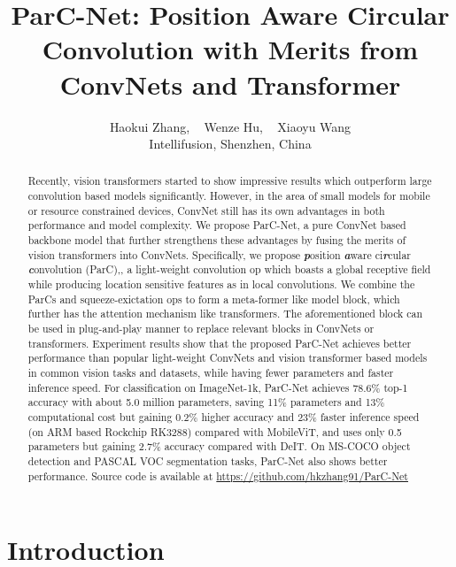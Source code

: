 \documentclass[10pt,twocolumn,letterpaper]{article}
\begin{document}
\title{ParC-Net: Position Aware Circular Convolution with Merits from ConvNets and Transformer}

\author{
Haokui Zhang,
~ Wenze Hu,
~ Xiaoyu Wang
\\
 Intellifusion, Shenzhen, China
}

\maketitle
\thispagestyle{empty}

\begin{abstract}
Recently, vision transformers started to show impressive results which outperform large convolution based models significantly. However, in the area of small models for mobile or resource constrained devices, ConvNet still has its own advantages in both performance and model complexity. We propose ParC-Net, a pure ConvNet based backbone model that further strengthens these advantages by fusing the merits of vision transformers into ConvNets. Specifically, we propose \textbf{\emph{p}}osition \textbf{\emph{a}}ware ci\textbf{\emph{r}}cular \textbf{\emph{c}}onvolution (ParC),, a light-weight convolution op which boasts a global receptive field while producing location sensitive features as in local convolutions. We combine the ParCs and squeeze-exictation ops to form a meta-former like model block, which further has the attention mechanism like transformers. The aforementioned block can be used in plug-and-play manner to replace relevant blocks in ConvNets or transformers. Experiment results show that the proposed ParC-Net achieves better performance than popular light-weight ConvNets and vision transformer based models in common vision tasks and datasets, while having fewer parameters and faster inference speed. For classification on ImageNet-1k, ParC-Net achieves 78.6\% top-1 accuracy with about 5.0 million parameters, saving 11\% parameters and 13\% computational cost but gaining 0.2\% higher accuracy and 23\% faster inference speed (on ARM based Rockchip RK3288) compared with MobileViT, and uses only 0.5 parameters but gaining 2.7\% accuracy compared with DeIT. On MS-COCO object detection and PASCAL VOC segmentation tasks, ParC-Net also shows better performance. Source code is available at \url{https://github.com/hkzhang91/ParC-Net} 
\end{abstract}




\section{Introduction}
\end{document}
